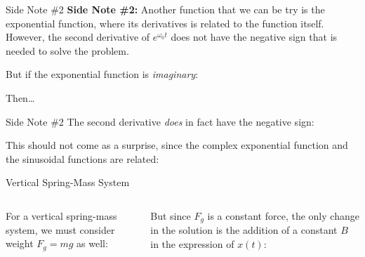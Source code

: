 \documentclass[12pt,compress,aspectratio=169]{beamer}
\begin{document}
\begin{frame}{Side Note \#2}
  \textbf{Side Note \#2:} Another function that we can be try is the
  exponential function, where its derivatives is related to the function
  itself. However, the second derivative of $e^{\omega_0t}$ does not have the
  negative sign that is needed to solve the problem.


  But if the exponential function is \emph{imaginary}:


  \vspace{-.1in}Then\ldots
\end{frame}



\begin{frame}{Side Note \#2}
  The second derivative \emph{does} in fact have the negative sign:

  
  This should not come as a surprise, since the complex exponential function
  and the sinusoidal functions are related:

\end{frame}



\begin{frame}{Vertical Spring-Mass System}
  \begin{columns}
    

    For a vertical spring-mass system, we must consider
    {\color{orange}weight $F_g=mg$} as well:


    But since $F_g$ is a constant force, the only change in the solution is the
    addition of a constant $B$ in the expression of $x(t)$:
    
    \vspace{-.3in}{\large
      \begin{align*}
        x(t) &= A\cos(\omega_0t+\theta_0) +B\\
        v(t) &= -A\omega_0\sin(\omega_0t+\theta_0)\\
        a(t) &= -A\omega_0^2\cos(\omega_0t+\theta_0)
      \end{align*}
    }
  \end{columns}
\end{frame}
\end{document}
